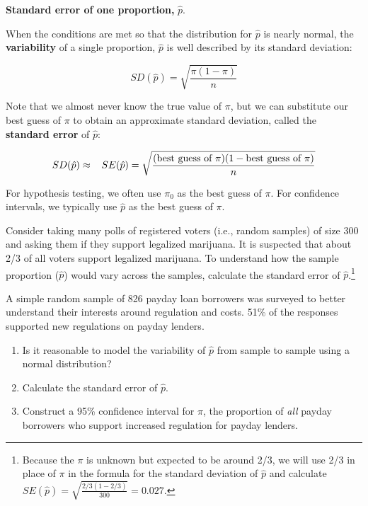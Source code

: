 \documentclass[
  10pt,
  openany]{book}
\theoremstyle{definition}
\theoremstyle{definition}
\theoremstyle{definition}
\theoremstyle{definition}
\theoremstyle{remark}
\begin{document}
\textbf{Standard error of one proportion,} \(\hat{p}\).

When the conditions are met so that the distribution for \(\hat{p}\) is nearly normal, the \textbf{variability} of a single proportion, \(\hat{p}\) is well described by its standard deviation:

\[SD(\hat{p}) = \sqrt{\frac{\pi(1-\pi)}{n}}\]

Note that we almost never know the true value of \(\pi\), but we can substitute our best guess of \(\pi\) to obtain an approximate standard deviation, called the \textbf{standard error} of \(\hat{p}\):

\[SD(\hat{p}) \approx \hspace{3mm} SE(\hat{p}) = \sqrt{\frac{(\mbox{best guess of }\pi)(1 - \mbox{best guess of }\pi)}{n}}\]

For hypothesis testing, we often use \(\pi_0\) as the best guess of \(\pi\). For confidence intervals, we typically use \(\hat{p}\) as the best guess of \(\pi\).


Consider taking many polls of registered voters (i.e., random samples) of size 300 and asking them if they support legalized marijuana. It is suspected that about 2/3 of all voters support legalized marijuana. To understand how the sample proportion (\(\hat{p}\)) would vary across the samples, calculate the standard error of \(\hat{p}\).\footnote{Because the \(\pi\) is unknown but expected to be around 2/3, we will use 2/3 in place of \(\pi\) in the formula for the standard deviation of \(\hat{p}\) and calculate\\
  \(SE(\hat{p}) = \sqrt{\frac{2/3 (1 - 2/3)} {300}} = 0.027\).}

A simple random sample of 826 payday loan borrowers was surveyed to better understand their interests around regulation and costs. 51\% of the responses supported new regulations on payday lenders.

\begin{enumerate}
\def\labelenumi{\arabic{enumi}.}
\item
  Is it reasonable to model the variability of \(\hat{p}\) from sample to sample using a normal distribution?
\item
  Calculate the standard error of \(\hat{p}\).
\item
  Construct a 95\% confidence interval for \(\pi\), the proportion of \emph{all} payday borrowers who support increased regulation for payday lenders.
\end{enumerate}
\end{document}
